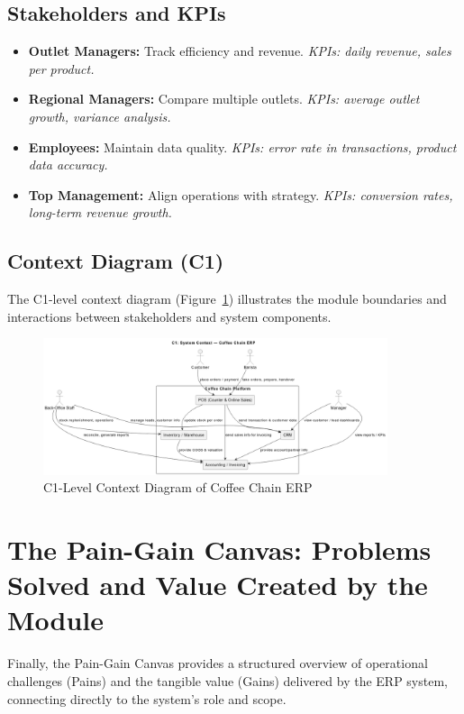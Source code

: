 \subsection*{Stakeholders and KPIs}
\begin{itemize}
    \item \textbf{Outlet Managers:} Track efficiency and revenue.  
          \textit{KPIs: daily revenue, sales per product.}
    \item \textbf{Regional Managers:} Compare multiple outlets.  
          \textit{KPIs: average outlet growth, variance analysis.}
    \item \textbf{Employees:} Maintain data quality.  
          \textit{KPIs: error rate in transactions, product data accuracy.}
    \item \textbf{Top Management:} Align operations with strategy.  
          \textit{KPIs: conversion rates, long-term revenue growth.}
\end{itemize}

\subsection*{Context Diagram (C1)}
The C1-level context diagram (Figure~\ref{fig:c1_context}) illustrates the module boundaries and interactions between stakeholders and system components.
\begin{figure}[H]
\centering
\includegraphics[width=0.9\textwidth,keepaspectratio]{diagrams/context.png}
\caption{C1-Level Context Diagram of Coffee Chain ERP}
\label{fig:c1_context}
\end{figure}

\section{The Pain-Gain Canvas: Problems Solved and Value Created by the Module}

Finally, the Pain-Gain Canvas provides a structured overview of operational challenges (Pains) and the tangible value (Gains) delivered by the ERP system, connecting directly to the system’s role and scope.

